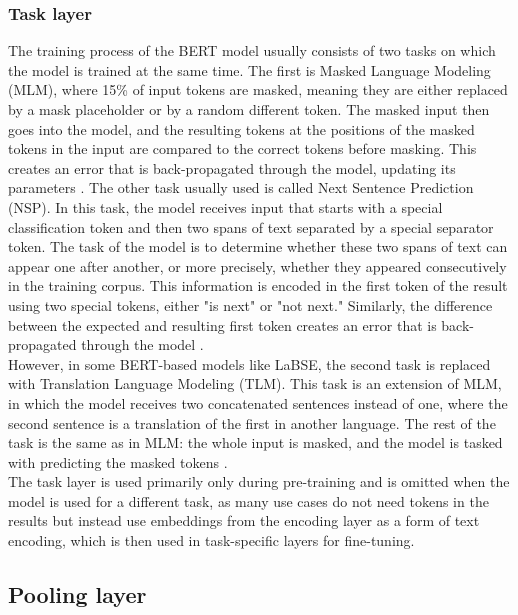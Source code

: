 \subsubsection{Task layer}

The training process of the BERT model usually consists of two tasks on which the model is trained at the same time. The first is Masked Language Modeling (MLM), where 15\% of input tokens are masked, meaning they are either replaced by a mask placeholder or by a random different token. The masked input then goes into the model, and the resulting tokens at the positions of the masked tokens in the input are compared to the correct tokens before masking. This creates an error that is back-propagated through the model, updating its parameters \cite{bert_pretr_1}. The other task usually used is called Next Sentence Prediction (NSP). In this task, the model receives input that starts with a special classification token and then two spans of text separated by a special separator token. The task of the model is to determine whether these two spans of text can appear one after another, or more precisely, whether they appeared consecutively in the training corpus. This information is encoded in the first token of the result using two special tokens, either "is next" or "not next." Similarly, the difference between the expected and resulting first token creates an error that is back-propagated through the model \cite{bert_pretr_2}.
\\

However, in some BERT-based models like LaBSE, the second task is replaced with Translation Language Modeling (TLM). This task is an extension of MLM, in which the model receives two concatenated sentences instead of one, where the second sentence is a translation of the first in another language. The rest of the task is the same as in MLM: the whole input is masked, and the model is tasked with predicting the masked tokens \cite{bert_pretr_3}. 
\\

The task layer is used primarily only during pre-training and is omitted when the model is used for a different task, as many use cases do not need tokens in the results but instead use embeddings from the encoding layer as a form of text encoding, which is then used in task-specific layers for fine-tuning.


\subsection{Pooling layer}

